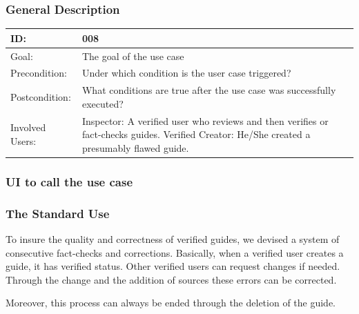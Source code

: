 \documentclass[12pt]{article}
\theoremstyle{definition}
\newenvironment{text}{
   \setlength{\parindent}{0pt}
   \color{black}
}{}
\begin{document}
    \subsubsection{General Description}
    
    
    \begin{tabular}{|p{.2\linewidth}|p{.65\linewidth}|}
    \hline 
    ID: & 008 \\ \hline
    Goal: & The goal of the use case \\ \hline
    Precondition: & Under which condition is the user case triggered? \\ \hline
    Postcondition: & What conditions are true after the use case was successfully executed? \\ \hline
    Involved Users: & Inspector: A verified user who reviews and then verifies or fact-checks guides. \newline
    Verified Creator: He/She created a presumably flawed guide.\\ \hline
    \end{tabular}
    
    \subsubsection{UI to call the use case}
    
    \subsubsection{The Standard Use}
    \begin{text}
    To insure the quality and correctness of verified guides, we devised a system of consecutive fact-checks and corrections. Basically, when a verified user creates a guide, it has verified status. Other verified users can request changes if needed. Through the change and the addition of sources these errors can be corrected. 
    
    Moreover, this process can always be ended through the deletion of the guide.
    \end{text}
    
\end{document}
